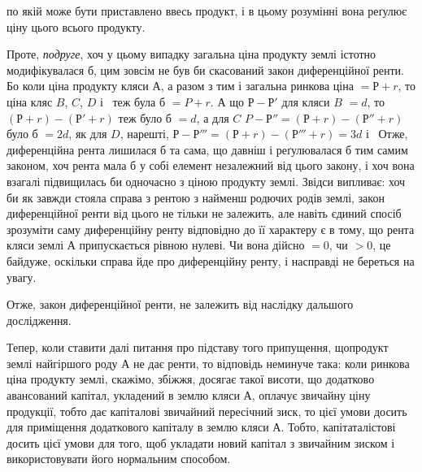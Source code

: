 \parcont{}  %
по якій може бути приставлено ввесь продукт, і в цьому розумінні вона реґулює
ціну цього всього продукту.

Проте, \emph{подруге}, хоч у цьому випадку загальна ціна продукту землі
істотно модифікувалася б, цим зовсім не був би скасований закон диференційної
ренти. Бо коли ціна продукту кляси $А$, а разом з тим і загальна ринкова
ціна $= Р + r$, то ціна кляс $B$, $C$, $D$ і~ теж була б
$= P + r$. А що
$Р - Р'$ для кляси $B$ $= d$, то $(Р + r) - (Р' + r)$ теж було б $= d$, а для $C$
$P - Р'' = (Р + r) - (Р'' + r)$ було б $= 2d$, як для $D$, нарешті,
$Р - Р''' = (Р + r) - (Р''' + r) = 3d$ і~ Отже, диференційна рента лишилася б та сама, що
давніш і реґулювалася б тим самим законом, хоч рента мала б у собі елемент незалежний
від цього закону, і хоч вона взагалі підвищилась би одночасно з ціною продукту
землі. Звідси випливає: хоч би як завжди стояла справа з рентою з найменш
родючих родів землі, закон диференційної ренти від цього не тільки не залежить,
але навіть єдиний спосіб зрозуміти саму диференційну ренту відповідно до її
характеру є в тому, що рента кляси землі А припускається рівною нулеві. Чи
вона дійсно $= 0$, чи $> 0$, це байдуже, оскільки справа йде про диференційну
ренту, і насправді не береться на увагу.

Отже, закон диференційної ренти, не залежить від наслідку дальшого
дослідження.

Тепер, коли ставити далі питання про підставу того припущення, щопродукт
землі найгіршого роду $А$ не дає ренти, то відповідь неминуче така:
коли ринкова ціна продукту землі, скажімо, збіжжя, досягає такої висоти, що
додатково авансований капітал, укладений в землю кляси $А$, оплачує звичайну
ціну продукції, тобто дає капіталові звичайний пересічний зиск, то цієї умови
досить для приміщення додаткового капіталу в землю кляси $А$. Тобто, капітаталістові
досить цієї умови для того, щоб укладати новий капітал з звичайним
зиском і використовувати його нормальним способом.

